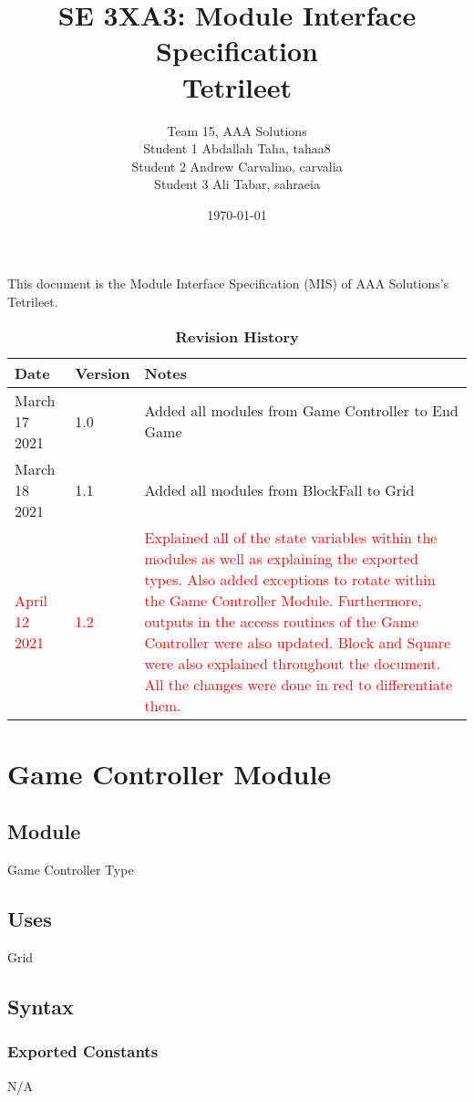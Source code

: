 \documentclass[12pt]{article}
\title{SE 3XA3: Module Interface Specification\\Tetrileet}
\author{Team 15, AAA Solutions
		\\ Student 1 Abdallah Taha, tahaa8
		\\ Student 2 Andrew Carvalino, carvalia
		\\ Student 3 Ali Tabar, sahraeia
}
\date{\today}
\begin{document}
\maketitle

This document is the Module Interface Specification (MIS) of AAA Solutions's Tetrileet.

\begin{table}[h!]
\caption{\bf Revision History}
\begin{tabularx}{\textwidth}{p{3cm}p{2cm}X}
\toprule {\bf Date} & {\bf Version} & {\bf Notes}\\
\midrule
March 17 2021 & 1.0 & Added all modules from Game Controller to End Game \\
March 18 2021 & 1.1 & Added all modules from BlockFall to Grid\\
\textcolor{red}{April 12 2021} & \textcolor{red}{1.2} & \textcolor{red}{Explained all of the state variables within the modules as well as explaining the exported types. Also added exceptions to rotate within the Game Controller Module. Furthermore, outputs in the access routines of the Game Controller were also updated. Block and Square were also explained throughout the document. All the changes were done in red to differentiate them.}\\
\bottomrule
\end{tabularx}
\end{table}

\newpage

\section* {Game Controller Module}

\subsection*{Module}

Game Controller Type

\subsection* {Uses}
Grid

\subsection* {Syntax}

\subsubsection* {Exported Constants}
N/A
\end{document}
